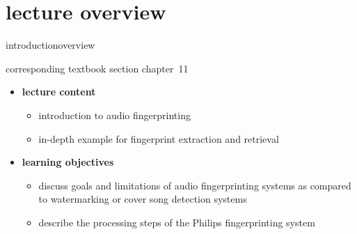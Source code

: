 


\subtitle{Module 11.0: Audio Fingerprinting}


	

    \section[overview]{lecture overview}
        \begin{frame}{introduction}{overview}
            \begin{block}{corresponding textbook section}
                    chapter~11
            \end{block}

            \begin{itemize}
                \item   \textbf{lecture content}
                    \begin{itemize}
                        \item   introduction to audio fingerprinting
                        \item   in-depth example for fingerprint extraction and retrieval
                    \end{itemize}
                \bigskip
                \item<2->   \textbf{learning objectives}
                    \begin{itemize}
                        \item   discuss goals and limitations of audio fingerprinting systems as compared to watermarking or cover song detection systems
                        \item   describe the processing steps of the Philips fingerprinting system
                    \end{itemize}
            \end{itemize}
        \end{frame}

